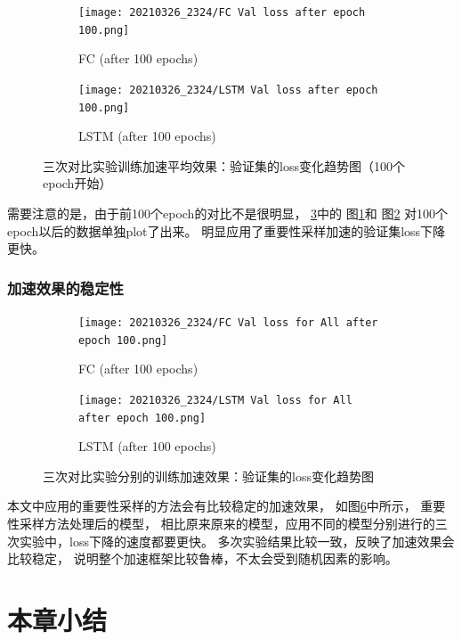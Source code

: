   \begin{figure}
    \begin{subfigure}[b]{0.45\textwidth}
        \centering
        \texttt{[image: 20210326\_2324/FC Val loss after epoch 100.png]}
        \caption{FC (after 100 epochs)}
        \label{fig:FC Val loss after epoch 100}
    \end{subfigure}
    \hfill
    \begin{subfigure}[b]{0.45\textwidth}
        \centering
        \texttt{[image: 20210326\_2324/LSTM Val loss after epoch 100.png]}
        \caption{LSTM (after 100 epochs)}
        \label{fig:LSTM Val loss after epoch 100}
    \end{subfigure}
      \caption{三次对比实验训练加速平均效果：验证集的loss变化趋势图（100个epoch开始）}
      \label{fig:importance-sampling-performance-after-100}
  \end{figure}
  需要注意的是，由于前100个epoch的对比不是很明显，
  \ref{fig:importance-sampling-performance-after-100}中的
  图\ref{fig:FC Val loss after epoch 100}和
  图\ref{fig:LSTM Val loss after epoch 100}
  对100个epoch以后的数据单独plot了出来。
  明显应用了重要性采样加速的验证集loss下降更快。

  \subsubsection{加速效果的稳定性}
  \begin{figure}
    \centering
    \begin{subfigure}[b]{0.45\textwidth}
        \centering
        \texttt{[image: 20210326\_2324/FC Val loss for All after epoch 100.png]}
        \caption{FC (after 100 epochs)}
        \label{fig:FC Val loss for All after epoch 100}
    \end{subfigure}
    \hfill
    \begin{subfigure}[b]{0.45\textwidth}
        \centering
        \texttt{[image: 20210326\_2324/LSTM Val loss for All after epoch 100.png]}
        \caption{LSTM (after 100 epochs)}
        \label{fig:LSTM Val loss for All after epoch 100}
    \end{subfigure}
      \caption{三次对比实验分别的训练加速效果：验证集的loss变化趋势图}
      \label{fig:importance-sampling-performance-All}
  \end{figure}

  本文中应用的重要性采样的方法会有比较稳定的加速效果，
  如图\ref{fig:importance-sampling-performance-All}中所示，
  重要性采样方法处理后的模型，
  相比原来原来的模型，应用不同的模型分别进行的三次实验中，loss下降的速度都要更快。
  多次实验结果比较一致，反映了加速效果会比较稳定，
  说明整个加速框架比较鲁棒，不太会受到随机因素的影响。

\section{本章小结}

